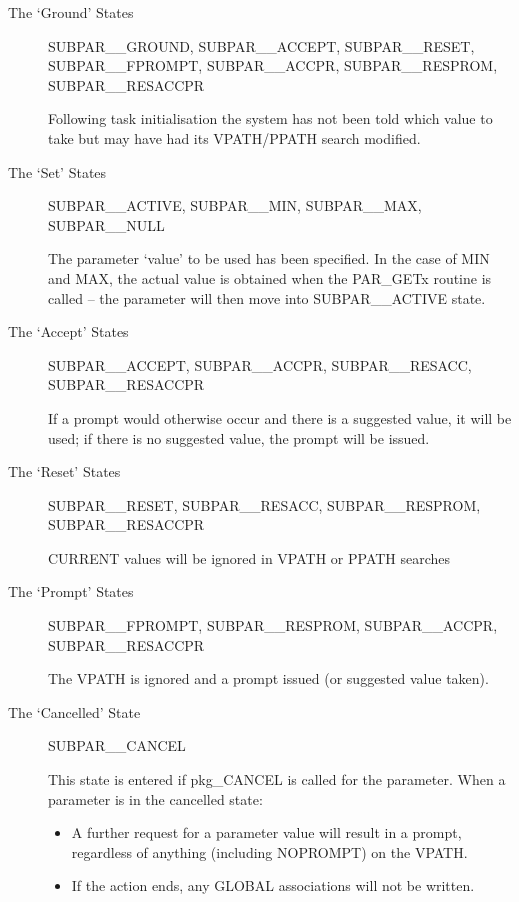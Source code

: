 \begin{description}
\item[The `Ground' States]
SUBPAR\_\_GROUND, SUBPAR\_\_ACCEPT, SUBPAR\_\_RESET, \\
SUBPAR\_\_FPROMPT, SUBPAR\_\_ACCPR, SUBPAR\_\_RESPROM, \\
SUBPAR\_\_RESACCPR

Following task initialisation the system has not been told which value to take
but may have had its VPATH/PPATH search modified.

\item[The `Set' States]
SUBPAR\_\_ACTIVE, SUBPAR\_\_MIN, SUBPAR\_\_MAX, \\
SUBPAR\_\_NULL

The parameter `value' to be used has been specified. In the case of MIN and
MAX, the actual value is obtained when the PAR\_GETx routine is called -- 
the parameter will then move into SUBPAR\_\_ACTIVE state.

\item[The `Accept' States]
SUBPAR\_\_ACCEPT, SUBPAR\_\_ACCPR, SUBPAR\_\_RESACC, \\
SUBPAR\_\_RESACCPR

If a prompt would otherwise occur and there is a suggested value, it will be 
used; if there is no suggested value, the prompt will be issued.

\item[The `Reset' States]
SUBPAR\_\_RESET, SUBPAR\_\_RESACC, SUBPAR\_\_RESPROM, \\
SUBPAR\_\_RESACCPR

CURRENT values will be ignored in VPATH or PPATH searches

\item[The `Prompt' States]
SUBPAR\_\_FPROMPT, SUBPAR\_\_RESPROM, SUBPAR\_\_ACCPR, SUBPAR\_\_RESACCPR

The VPATH is ignored and a prompt issued (or suggested value taken).


\item[The `Cancelled' State]
SUBPAR\_\_CANCEL

This state is entered if pkg\_CANCEL is called for the parameter. 
When a parameter is in the cancelled state:
\begin{itemize}
\item A further request for a parameter value will result in a prompt,
regardless of anything (including NOPROMPT) on the VPATH.
\item If the action ends, any GLOBAL associations will not be written.
\end{itemize}
\end{description}

